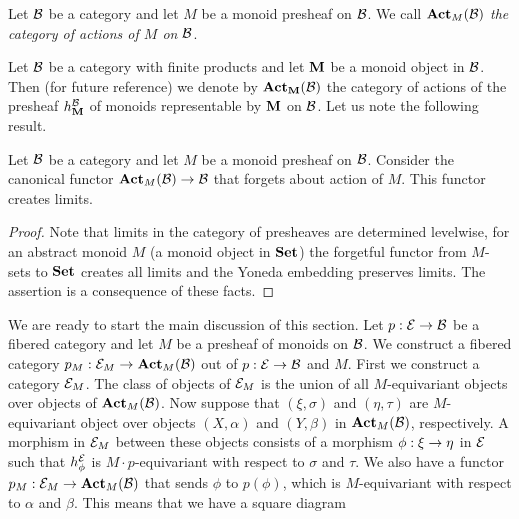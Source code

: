 \begin{definition}
Let ${\mathcal B}$ be a category and let $M$ be a monoid presheaf on ${\mathcal B}$. We call $\mathbf{Act}_M({\mathcal B})$ \textit{the category of actions of $M$ on ${\mathcal B}$}.
\end{definition}
\noindent
Let ${\mathcal B}$ be a category with finite products and let $\mathbf{M}$ be a monoid object in ${\mathcal B}$. Then (for future reference) we denote by $\mathbf{Act}_{\mathbf{M}}({\mathcal B})$ the category of actions of the presheaf $h^{{\mathcal B}}_{\mathbf{M}}$ of monoids representable by $\mathbf{M}$ on ${\mathcal B}$. Let us note the following result.

\begin{proposition}\label{proposition:creation_of_limits_for_actions_of_monoids}
Let ${\mathcal B}$ be a category and let $M$ be a monoid presheaf on ${\mathcal B}$. Consider the canonical functor $\mathbf{Act}_{M}({\mathcal B})\rightarrow {\mathcal B}$ that forgets about action of $M$. This functor creates limits.
\end{proposition}
\begin{proof}
Note that limits in the category of presheaves are determined levelwise, for an abstract monoid $M$ (a monoid object in $\mathbf{Set}$) the forgetful functor from $M$-sets to $\mathbf{Set}$ creates all limits and the Yoneda embedding preserves limits. The assertion is a consequence of these facts. 
\end{proof}
\noindent
We are ready to start the main discussion of this section. Let $p:{\mathcal E}\rightarrow {\mathcal B}$ be a fibered category and let $M$ be a presheaf of monoids on ${\mathcal B}$. We construct a fibered category $p_{M}:{\mathcal E}_M\rightarrow \mathbf{Act}_{M}({\mathcal B})$ out of $p:{\mathcal E}\rightarrow {\mathcal B}$ and $M$. First we construct a category ${\mathcal E}_M$. The class of objects of ${\mathcal E}_M$ is the union of all $M$-equivariant objects over objects of $\mathbf{Act}_M({\mathcal B})$. Now suppose that $(\xi,\sigma)$ and $(\eta,\tau)$ are $M$-equivariant object over objects $(X,\alpha)$ and $(Y,\beta)$ in $\mathbf{Act}_{M}({\mathcal B})$, respectively. A morphism in ${\mathcal E}_M$ between these objects consists of a morphism $\phi:\xi\rightarrow \eta$ in ${\mathcal E}$ such that $h^{{\mathcal E}}_{\phi}$ is $M\cdot p$-equivariant with respect to $\sigma$ and $\tau$. We also have a functor $p_M:{\mathcal E}_M\rightarrow \mathbf{Act}_{M}({\mathcal B})$ that sends $\phi$ to $p(\phi)$, which is $M$-equivariant with respect to $\alpha$ and $\beta$. This means that we have a square diagram
\begin{center}
\end{center}
